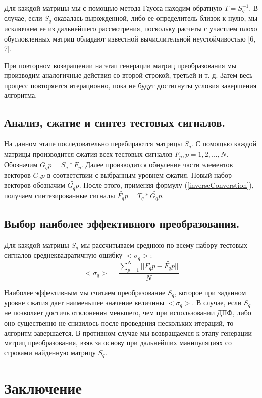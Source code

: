 \documentclass[11pt, oneside, a4paper]{article}
\begin{document}
Для каждой матрицы мы с помощью метода Гаусса находим обратную $T=S_q^{-1}$. В случае, если $S_q$ оказалась вырожденной, либо ее определитель близок к нулю, мы исключаем ее из дальнейшего рассмотрения, поскольку расчеты с участием плохо обусловленных матриц обладают известной вычислительной неустойчивостью [6, 7].

При повторном возвращении на этап генерации матриц преобразования мы производим аналогичные действия со второй строкой, третьей и т. д. Затем весь процесс повторяется итерационно, пока не будут достигнуты условия завершения алгоритма. 

\subsection{Анализ, сжатие и синтез тестовых сигналов.}

На данном этапе последовательно перебираются матрицы $S_q$. С помощью каждой матрицы производится сжатия всех тестовых сигналов $F_p, p=1,2,...,N$. Обозначим $G_qp=S_q*F_p$. Далее производится обнуление части элементов векторов $G_qp$ в соответствии с выбранным уровнем сжатия. Новый набор векторов обозначим $\tilde{G_qp}$. После этого, применяя формулу (\ref{inverseConverstion}), получаем синтезированные сигналы $\tilde{F_qp}=T_q*\tilde{G_qp}$.

\subsection{Выбор наиболее эффективного преобразования.}

Для каждой матрицы $S_q$ мы рассчитываем среднюю по всему набору тестовых сигналов среднеквадратичную ошибку $<\sigma_q>$:
\begin{equation}
\label{squareNormQ}
    <\sigma_q> = \frac{\sum\limits_{p=1}^{N}||F_qp-\tilde{F_qp}||}{N}
\end{equation}

Наиболее эффективным мы считаем преобразование $S_q$, которое при заданном уровне сжатия дает наименьшее значение величины $<\sigma_q>$. В случае, если $S_q$ не позволяет достичь отклонения  меньшего, чем при использовании ДПФ, либо оно существенно не снизилось после проведения нескольких итераций, то алгоритм завершается. В противном случае мы возвращаемся к этапу генерации матриц преобразования, взяв за основу при дальнейших манипуляциях со строками найденную матрицу $S_q$.

\section{Заключение}
\end{document}
